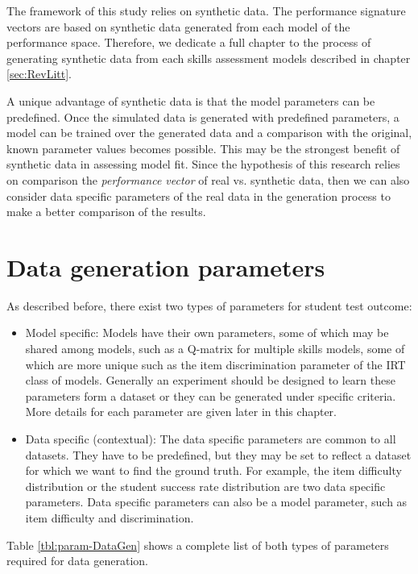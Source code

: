 \label{sec:Syn}

The framework of this study relies on synthetic data. The performance signature vectors are based on synthetic data generated from each model of the performance space. Therefore, we dedicate a full chapter to the process of generating synthetic data from each skills assessment models described in chapter \ref{sec:RevLitt}.

A unique advantage of synthetic data is that the model parameters can be predefined. Once the simulated data is generated with predefined parameters, a model can be trained over the generated data and a comparison with the original, known parameter values becomes possible. This may be the strongest benefit of synthetic data in assessing model fit. Since the hypothesis of this research relies on comparison the \textit{performance vector} of real vs. synthetic data, then we can also consider data specific parameters of the real data in the generation process to make a better comparison of the results.

\section{Data generation parameters}

As described before, there exist two types of parameters for student test outcome:
\begin{itemize}
\item Model specific: Models have their own parameters, some of which may be shared among models, such as a Q-matrix for multiple skills models, some of which are more unique such as the item discrimination parameter of the IRT class of models. Generally an experiment should be designed to learn these parameters form a dataset or they can be generated under specific criteria. More details for each parameter are given later in this chapter.
\item Data specific (contextual): The data specific parameters are common to all datasets. They have to be predefined, but they may be set to reflect a dataset for which we want to find the ground truth. For example, the item difficulty distribution or the student success rate distribution are two data specific parameters. Data specific parameters can also be a model parameter, such as item difficulty and discrimination.
\end{itemize}

Table \ref{tbl:param-DataGen} shows a complete list of both types of parameters required for data generation.

